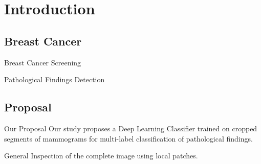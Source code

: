 \section{Introduction}
\subsection{Breast Cancer}

\begin{frame}{Breast Cancer Screening}
    
\end{frame}

\begin{frame}{Pathological Findings Detection}
    
\end{frame}

\subsection{Proposal}
\begin{frame}{Our Proposal}
    Our study proposes a Deep Learning Classifier trained on cropped segments of mammograms for multi-label classification of pathological findings.

    General Inspection of the complete image using local patches.
\end{frame}

